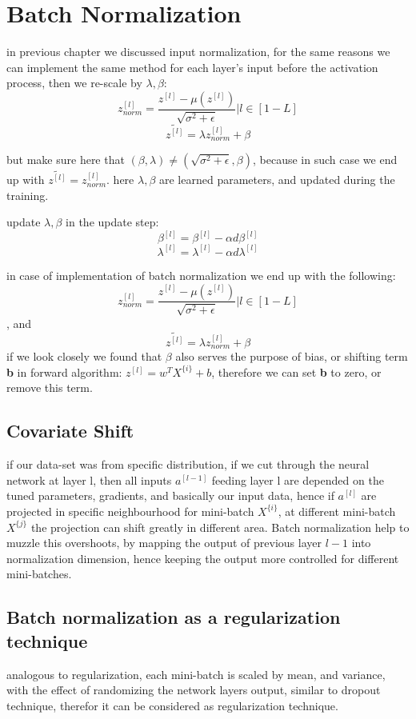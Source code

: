 \documentclass[4apaper,12pt]{book}
\begin{document}
  \section{Batch Normalization}
  \begin{description}
\item in previous chapter we discussed input normalization, for the same reasons we can implement the same method for each layer's input before the activation process, then we re-scale by $\lambda,\beta$: $$
  z_{norm}^{[l]} = \frac{z^{[l]} - \mu({z^{[l]}})}{\sqrt{\sigma^2+\epsilon}} | l \in [1-L] $$
  $$\widetilde{z^{[l]}}  = \lambda z_{norm}^{[l]}  + \beta $$
\item but make sure here that $(\beta,\lambda)\neq(\sqrt{\sigma^2+\epsilon}, \beta)$, because in such case we end up with  $\widetilde{z^{[l]}} = z_{norm}^{[l]}$. here $\lambda, \beta$ are learned parameters, and updated during the training.
\item update $\lambda, \beta$ in the update step:
  $$ \beta^{[l]} = \beta^{[l]} -\alpha d\beta^{[l]} $$
  $$ \lambda^{[l]} = \lambda^{[l]} -\alpha d\lambda^{[l]} $$
\item in case of implementation of batch normalization we end up with the following: $$ z_{norm}^{[l]} = \frac{z^{[l]} - \mu({z^{[l]}})}{\sqrt{\sigma^2+\epsilon}} | l \in [1-L] $$, and  $$\widetilde{z^{[l]}}  = \lambda z_{norm}^{[l]}  + \beta $$ if we look closely we found that $\beta$ also serves the purpose of bias, or shifting term \textbf{b} in forward algorithm: $z^{[l]} = w^TX^{\{i\}} + b$, therefore we can set \textbf{b} to zero, or remove this term.
  \subsection{Covariate Shift}
\item if our data-set was from specific distribution, if we cut through the neural network at layer l, then all inputs $a^{[l-1]}$ feeding layer l are depended on the tuned parameters, gradients, and basically our input data, hence if $a^{[l]}$ are projected in specific neighbourhood  for mini-batch $X^{\{i\}}$, at different mini-batch $X^{\{j\}}$ the projection can shift greatly in different area. Batch normalization help to muzzle this overshoots, by mapping the output of previous layer $l-1$ into normalization dimension, hence keeping the output more controlled for different mini-batches.
  \subsection{Batch normalization as a regularization technique}
\item analogous to regularization, each mini-batch is scaled by mean, and variance, with the effect of randomizing the network layers output, similar to dropout technique, therefor it can be considered as regularization technique.

\end{description}
\end{document}
